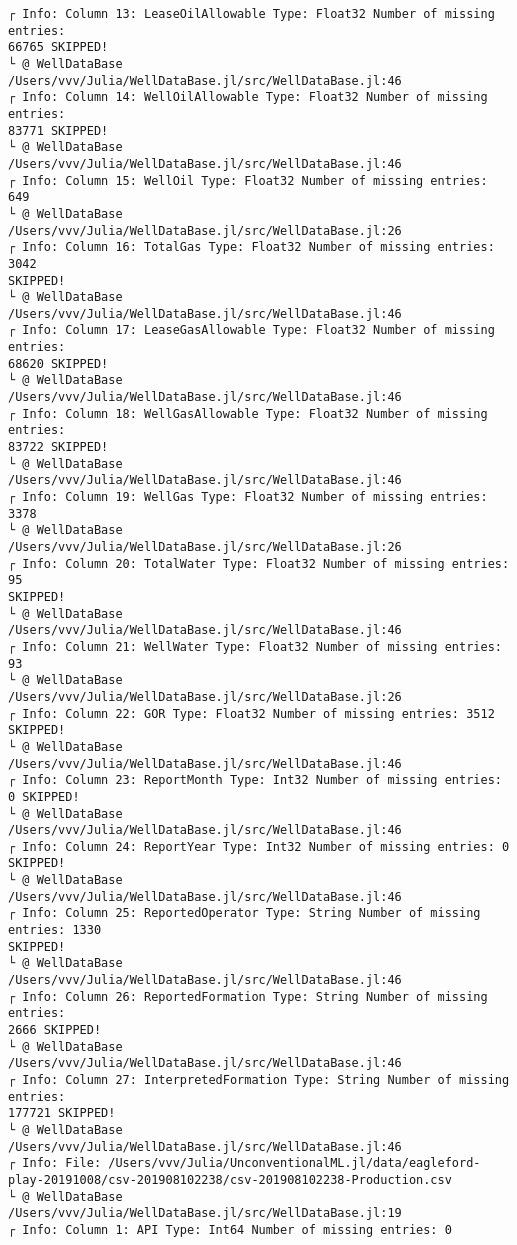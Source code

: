 \documentclass[11pt]{article}
\begin{document}
\begin{Verbatim}[commandchars=\\\{\}]
┌ Info: Column 13: LeaseOilAllowable Type: Float32 Number of missing entries:
66765 SKIPPED!
└ @ WellDataBase /Users/vvv/Julia/WellDataBase.jl/src/WellDataBase.jl:46
┌ Info: Column 14: WellOilAllowable Type: Float32 Number of missing entries:
83771 SKIPPED!
└ @ WellDataBase /Users/vvv/Julia/WellDataBase.jl/src/WellDataBase.jl:46
┌ Info: Column 15: WellOil Type: Float32 Number of missing entries: 649
└ @ WellDataBase /Users/vvv/Julia/WellDataBase.jl/src/WellDataBase.jl:26
┌ Info: Column 16: TotalGas Type: Float32 Number of missing entries: 3042
SKIPPED!
└ @ WellDataBase /Users/vvv/Julia/WellDataBase.jl/src/WellDataBase.jl:46
┌ Info: Column 17: LeaseGasAllowable Type: Float32 Number of missing entries:
68620 SKIPPED!
└ @ WellDataBase /Users/vvv/Julia/WellDataBase.jl/src/WellDataBase.jl:46
┌ Info: Column 18: WellGasAllowable Type: Float32 Number of missing entries:
83722 SKIPPED!
└ @ WellDataBase /Users/vvv/Julia/WellDataBase.jl/src/WellDataBase.jl:46
┌ Info: Column 19: WellGas Type: Float32 Number of missing entries: 3378
└ @ WellDataBase /Users/vvv/Julia/WellDataBase.jl/src/WellDataBase.jl:26
┌ Info: Column 20: TotalWater Type: Float32 Number of missing entries: 95
SKIPPED!
└ @ WellDataBase /Users/vvv/Julia/WellDataBase.jl/src/WellDataBase.jl:46
┌ Info: Column 21: WellWater Type: Float32 Number of missing entries: 93
└ @ WellDataBase /Users/vvv/Julia/WellDataBase.jl/src/WellDataBase.jl:26
┌ Info: Column 22: GOR Type: Float32 Number of missing entries: 3512 SKIPPED!
└ @ WellDataBase /Users/vvv/Julia/WellDataBase.jl/src/WellDataBase.jl:46
┌ Info: Column 23: ReportMonth Type: Int32 Number of missing entries: 0 SKIPPED!
└ @ WellDataBase /Users/vvv/Julia/WellDataBase.jl/src/WellDataBase.jl:46
┌ Info: Column 24: ReportYear Type: Int32 Number of missing entries: 0 SKIPPED!
└ @ WellDataBase /Users/vvv/Julia/WellDataBase.jl/src/WellDataBase.jl:46
┌ Info: Column 25: ReportedOperator Type: String Number of missing entries: 1330
SKIPPED!
└ @ WellDataBase /Users/vvv/Julia/WellDataBase.jl/src/WellDataBase.jl:46
┌ Info: Column 26: ReportedFormation Type: String Number of missing entries:
2666 SKIPPED!
└ @ WellDataBase /Users/vvv/Julia/WellDataBase.jl/src/WellDataBase.jl:46
┌ Info: Column 27: InterpretedFormation Type: String Number of missing entries:
177721 SKIPPED!
└ @ WellDataBase /Users/vvv/Julia/WellDataBase.jl/src/WellDataBase.jl:46
┌ Info: File: /Users/vvv/Julia/UnconventionalML.jl/data/eagleford-
play-20191008/csv-201908102238/csv-201908102238-Production.csv
└ @ WellDataBase /Users/vvv/Julia/WellDataBase.jl/src/WellDataBase.jl:19
┌ Info: Column 1: API Type: Int64 Number of missing entries: 0

\end{Verbatim}
\end{document}
